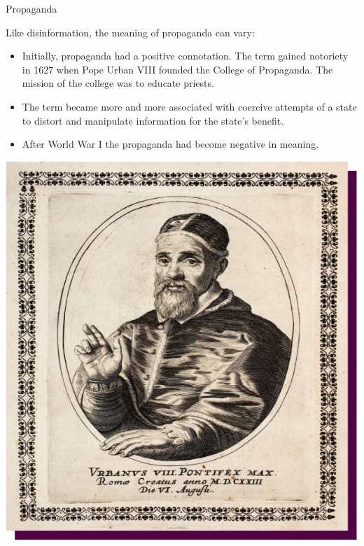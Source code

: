 \documentclass[nobackground,dvipsnames,table]{beamer}
\begin{document}
\begin{frame}{Propaganda}

\begin{minipage}{0.5\textwidth}
    \footnotesize{
        Like disinformation, the meaning of propaganda can vary:
        \begin{itemize}
            \item Initially, propaganda had a positive connotation.  The term gained notoriety in 1627 when Pope Urban VIII founded the College of Propaganda.  The mission of the college was to educate priests.
            \item The term became more and more associated with coercive attempts of a state to distort and manipulate information for the state's benefit.  
            \item After World War I the propaganda had become negative in meaning.
        \end{itemize}
    }
\end{minipage}
\hspace{0.05\textwidth}
\begin{minipage}{0.42\textwidth}
    \includegraphics[width=\textwidth]{img/fig2.jpg}
\end{minipage}

\end{frame}
\end{document}
